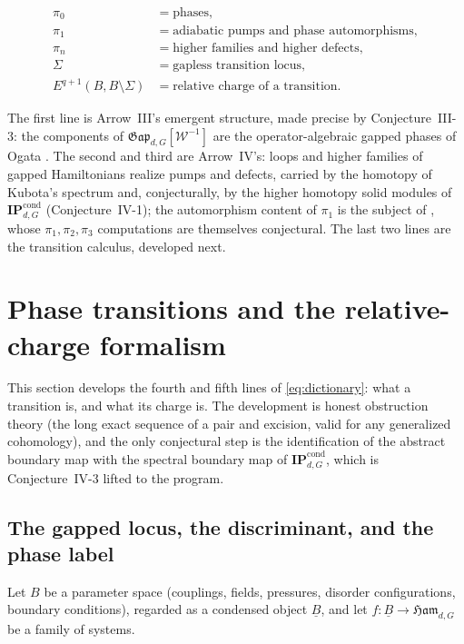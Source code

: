 \documentclass[12pt]{article}
\newcommand{\cond}[1]{\underline{#1}}          %
\newcommand{\Ham}{\mathfrak{Ham}}              %
\newcommand{\Gap}{\mathfrak{Gap}}              %
\newcommand{\Weq}{\mathcal{W}}                 %
\newcommand{\IPcond}{\mathbf{IP}^{\mathrm{cond}}}  %
\newcommand{\Sig}{\Sigma}                       %
\theoremstyle{plain}
\theoremstyle{definition}
\theoremstyle{remark}
\begin{document}
\begin{equation}
\label{eq:dictionary}
\boxed{
\begin{aligned}
\pi_0 &= \text{phases},\\
\pi_1 &= \text{adiabatic pumps and phase automorphisms},\\
\pi_n &= \text{higher families and higher defects},\\
\Sig &= \text{gapless transition locus},\\
E^{q+1}(B,B\setminus\Sig) &= \text{relative charge of a transition}.
\end{aligned}}
\end{equation}

The first line is Arrow~III's emergent structure, made precise by Conjecture~III-3: the
components of $\Gap_{d,G}[\Weq^{-1}]$ are the operator-algebraic gapped phases of Ogata
\cite{ogata-classification-review}. The second and third are Arrow~IV's: loops and
higher families of gapped Hamiltonians realize pumps and defects, carried by the homotopy
of Kubota's spectrum \cite{kubota-omega-spectrum} and, conjecturally, by the higher
homotopy solid modules of $\IPcond_{d,G}$ (Conjecture~IV-1); the automorphism content of
$\pi_1$ is the subject of \cite{aasen-wang-hastings}, whose $\pi_1,\pi_2,\pi_3$
computations are themselves conjectural. The last two lines are the transition calculus,
developed next.

\section{Phase transitions and the relative-charge formalism}
\label{sec:transitions}

This section develops the fourth and fifth lines of \eqref{eq:dictionary}: what a
transition is, and what its charge is. The development is honest obstruction theory (the
long exact sequence of a pair and excision, valid for any generalized cohomology), and
the only conjectural step is the identification of the abstract boundary map with the
spectral boundary map of $\IPcond_{d,G}$, which is Conjecture~IV-3 lifted to the program.

\subsection{The gapped locus, the discriminant, and the phase label}
\label{sec:locus}

Let $B$ be a parameter space (couplings, fields, pressures, disorder configurations,
boundary conditions), regarded as a condensed object $\cond{B}$, and let
$f:\cond{B}\to\Ham_{d,G}$ be a family of systems.
\end{document}
